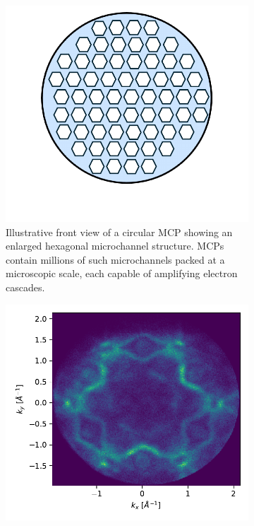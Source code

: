\begin{figure}[h]
    \centering
    \begin{subfigure}[t]{0.49\linewidth}
        \centering
        \includegraphics[width=\linewidth]{images/mcp.pdf}
        \caption{Illustrative front view of a circular \gls{MCP} showing an enlarged hexagonal microchannel structure. \Glspl{MCP} contain millions of such microchannels packed at a microscopic scale, each capable of amplifying electron cascades.}
        \label{fig:mcp}
    \end{subfigure}
    \hfill
    \begin{subfigure}[t]{0.49\linewidth}
        \centering
        \includegraphics[width=\linewidth]{images/calibrated_momentum.pdf}

\end{subfigure}
\end{figure}
